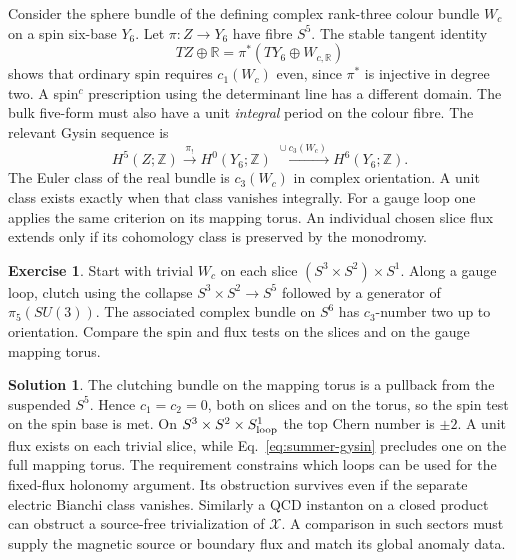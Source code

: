 \documentclass[10pt]{article}
\theoremstyle{definition}
\newtheorem{exercise}{Exercise}
\newtheorem{solution}{Solution}
\begin{document}
Consider the sphere bundle of the defining complex rank-three colour bundle \(W_c\) on a spin six-base \(Y_6\). Let \(\pi:Z\to Y_6\) have fibre \(S^5\). The stable tangent identity
\begin{equation}
 TZ\oplus\mathbb R=\pi^*(TY_6\oplus W_{c,\mathbb R})
\end{equation}
shows that ordinary spin requires \(c_1(W_c)\) even, since \(\pi^*\) is injective in degree two. A spin\(^{c}\) prescription using the determinant line has a different domain. The bulk five-form must also have a unit \emph{integral} period on the colour fibre. The relevant Gysin sequence is
\begin{equation}
 H^5(Z;\mathbb Z)\xrightarrow{\ \pi_!\ } H^0(Y_6;\mathbb Z)
                \xrightarrow{\ \cup c_3(W_c)\ } H^6(Y_6;\mathbb Z).
 \label{eq:summer-gysin}
\end{equation}
The Euler class of the real bundle is \(c_3(W_c)\) in complex orientation. A unit class exists exactly when that class vanishes integrally. For a gauge loop one applies the same criterion on its mapping torus. An individual chosen slice flux extends only if its cohomology class is preserved by the monodromy.

\begin{exercise}
Start with trivial \(W_c\) on each slice \((S^3\times S^2)\times S^1\). Along a gauge loop, clutch using the collapse \(S^3\times S^2\to S^5\) followed by a generator of \(\pi_5(SU(3))\). The associated complex bundle on \(S^6\) has \(c_3\)-number two up to orientation. Compare the spin and flux tests on the slices and on the gauge mapping torus.
\end{exercise}

\begin{solution}
The clutching bundle on the mapping torus is a pullback from the suspended \(S^5\). Hence \(c_1=c_2=0\), both on slices and on the torus, so the spin test on the spin base is met. On \(S^3\times S^2\times S^1_{\rm loop}\) the top Chern number is \(\pm2\). A unit flux exists on each trivial slice, while Eq.~\eqref{eq:summer-gysin} precludes one on the full mapping torus. The requirement constrains which loops can be used for the fixed-flux holonomy argument. Its obstruction survives even if the separate electric Bianchi class vanishes. Similarly a QCD instanton on a closed product can obstruct a source-free trivialization of \(\mathcal X\). A comparison in such sectors must supply the magnetic source or boundary flux and match its global anomaly data.
\end{solution}
\end{document}
